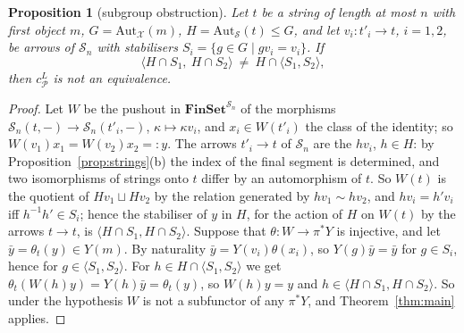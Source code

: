 \documentclass[11pt]{amsart}
\newtheorem{prop}[thm]{Proposition}
\theoremstyle{definition}
\newcommand{\Fin}{\mathbf{FinSet}}
\newcommand{\Aut}{\mathrm{Aut}}
\newcommand{\cX}{\mathcal X}
\newcommand{\cP}{\mathcal P}
\newcommand{\cS}{\mathcal S}
\begin{document}
\begin{prop}[subgroup obstruction]\label{prop:modular}
Let $t$ be a string of length at most $n$ with first object $m$,
$G=\Aut_{\cX}(m)$, $H=\Aut_{\cS}(t)\le G$, and let $v_i\colon t'_i\to
t$, $i=1,2$, be arrows of $\cS_n$ with stabilisers $S_i=\{g\in G\mid
gv_i=v_i\}$. If
\[
\langle H\cap S_1,\ H\cap S_2\rangle\ \ne\ H\cap\langle S_1,S_2\rangle,
\]
then $c^L_\cP$ is not an equivalence.
\end{prop}
\begin{proof}
Let $W$ be the pushout in $\Fin^{\cS_n}$ of the morphisms
$\cS_n(t,-)\to\cS_n(t'_i,-)$, $\kappa\mapsto\kappa v_i$, and $x_i\in
W(t'_i)$ the class of the identity; so $W(v_1)x_1=W(v_2)x_2=:y$. The
arrows $t'_i\to t$ of $\cS_n$ are the $hv_i$, $h\in H$: by
Proposition~\ref{prop:strings}(b) the index of the final segment is
determined, and two isomorphisms of strings onto $t$ differ by an
automorphism of $t$. So $W(t)$ is the quotient of $Hv_1\sqcup Hv_2$ by
the relation generated by $hv_1\sim hv_2$, and $hv_i=h'v_i$ iff
$h^{-1}h'\in S_i$; hence the stabiliser of $y$ in $H$, for the action
of $H$ on $W(t)$ by the arrows $t\to t$, is $\langle H\cap S_1,H\cap
S_2\rangle$. Suppose that $\theta\colon W\to\pi^*Y$ is injective, and
let $\bar y=\theta_t(y)\in Y(m)$. By naturality $\bar y=Y(v_i)
\theta(x_i)$, so $Y(g)\bar y=\bar y$ for $g\in S_i$, hence for
$g\in\langle S_1,S_2\rangle$. For $h\in H\cap\langle S_1,S_2\rangle$
we get $\theta_t(W(h)y)=Y(h)\bar y=\theta_t(y)$, so $W(h)y=y$ and
$h\in\langle H\cap S_1,H\cap S_2\rangle$. So under the hypothesis $W$
is not a subfunctor of any $\pi^*Y$, and Theorem~\ref{thm:main}
applies.
\end{proof}
\end{document}
